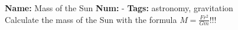 \documentclass{standalone}
\begin{document}
\noindent\textbf{Name:} Mass of the Sun\quad
\textbf{Num:} -\quad
\textbf{Tags:} astronomy, gravitation\\[4pt]
Calculate the mass of the Sun with the formula $M=\frac{Fr^2}{Gm}$!!!
\end{document}

